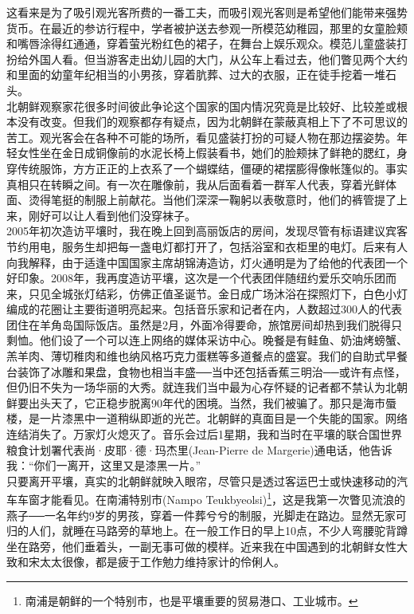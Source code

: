 这看来是为了吸引观光客所费的一番工夫，而吸引观光客则是希望他们能带来强势货币。在最近的参访行程中，学者被护送去参观一所模范幼稚园，那里的女童脸颊和嘴唇涂得红通通，穿着萤光粉红色的裙子，在舞台上娱乐观众。模范儿童盛装打扮给外国人看。但当游客走出幼儿园的大门，从公车上看过去，他们瞥见两个大约和里面的幼童年纪相当的小男孩，穿着肮葬、过大的衣服，正在徒手挖着一堆石头。\\

北朝鲜观察家花很多时间彼此争论这个国家的国内情况究竟是比较好、比较差或根本没有改变。但我们的观察都存有疑点，因为北朝鲜在蒙蔽真相上下了不可思议的苦工。观光客会在各种不可能的场所，看见盛装打扮的可疑人物在那边摆姿势。年轻女性坐在金日成铜像前的水泥长椅上假装看书，她们的脸颊抹了鲜艳的腮红，身穿传统服饰，方方正正的上衣系了一个蝴蝶结，僵硬的裙摆膨得像帐篷似的。事实真相只在转瞬之间。有一次在雕像前，我从后面看着一群军人代表，穿着光鲜体面、烫得笔挺的制服上前献花。当他们深深一鞠躬以表敬意时，他们的裤管提了上来，刚好可以让人看到他们没穿袜子。\\

2005年初次造访平壤时，我在晚上回到高丽饭店的房间，发现尽管有标语建议宾客节约用电，服务生却把每一盏电灯都打开了，包括浴室和衣柜里的电灯。后来有人向我解释，由于适逢中国国家主席胡锦涛造访，灯火通明是为了给他的代表团一个好印象。2008年，我再度造访平壤，这次是一个代表团伴随纽约爱乐交响乐团而来，只见全城张灯结彩，仿佛正值圣诞节。金日成广场沐浴在探照灯下，白色小灯编成的花圈让主要街道明亮起来。包括音乐家和记者在内，人数超过300人的代表团住在羊角岛国际饭店。虽然是2月，外面冷得要命，旅馆房间却热到我们脱得只剩恤。他们设了一个可以连上网络的媒体采访中心。晚餐是有鲑鱼、奶油烤螃蟹、羔羊肉、薄切稚肉和维也纳风格巧克力蛋糕等多道餐点的盛宴。我们的自助式早餐台装饰了冰雕和果盘，食物也相当丰盛──当中还包括香蕉三明治──或许有点怪，但仍旧不失为一场华丽的大秀。就连我们当中最为心存怀疑的记者都不禁认为北朝鲜要出头天了，它正稳步脱离90年代的困境。当然，我们被骗了。那只是海市蜃楼，是一片漆黑中一道稍纵即逝的光芒。北朝鲜的真面目是一个失能的国家。网络连结消失了。万家灯火熄灭了。音乐会过后1星期，我和当时在平壤的联合国世界粮食计划署代表尚·皮耶·德·玛杰里(Jean-Pierre de Margerie)通电话，他告诉我：“你们一离开，这里又是漆黑一片。”\\

只要离开平壤，真实的北朝鲜就映入眼帘，尽管只是透过客运巴士或快速移动的汽车车窗才能看见。在南浦特别市(Nampo Teukbyeolsi)\footnote{南浦是朝鲜的一个特别市，也是平壤重要的贸易港口、工业城市。}，这是我第一次瞥见流浪的燕子──一名年约9岁的男孩，穿着一件葬兮兮的制服，光脚走在路边。显然无家可归的人们，就睡在马路旁的草地上。在一般工作日的早上10点，不少人弯腰驼背蹲坐在路旁，他们垂着头，一副无事可做的模样。近来我在中国遇到的北朝鲜女性大致和宋太太很像，都是疲于工作勉力维持家计的伶俐人。\\

